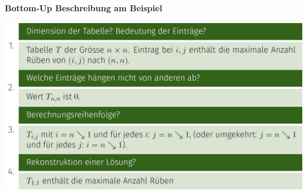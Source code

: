 \vspace{-4pt}
\begin{sectionbox}
\textbf{Bottom-Up Beschreibung am Beispiel}\par
\begin{center}
    \includegraphics[width = \columnwidth]{../img/kanTable.png}
\end{center}\smallskip

\end{sectionbox}

